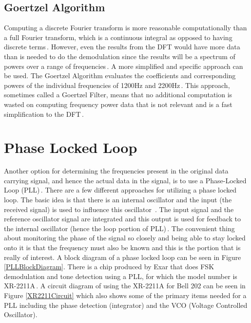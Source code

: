 \subsection{Goertzel Algorithm}
Computing a discrete Fourier transform is more reasonable computationally than a full Fourier transform, which is a continuous integral as opposed to having discrete terms\,\cite{WikipediaFT}. However, even the results from the DFT would have more data than is needed to do the demodulation since the results will be a spectrum of powers over a range of frequencies\,\cite{WikipediaDFT,WikipediaFFT}. A more simplified and specific approach can be used. The Goertzel Algorithm evaluates the coefficients and corresponding powers of the individual frequencies of 1200Hz and 2200Hz\,\cite{WikipediaGA,Elmenreich2011}. This approach, sometimes called a Goertzel Filter, means that no additional computation is wasted on computing frequency power data that is not relevant and is a fast simplification to the DFT\,\cite{SanjitK1993}.

\section{Phase Locked Loop}
Another option for determining the frequencies present in the original data carrying signal, and hence the actual data in the signal, is to use a Phase-Locked Loop (PLL)\,\cite{Akoum,Perrott2009,Lutus2011}. There are a few different approaches for utilizing a phase locked loop. The basic idea is that there is an internal oscillator and the input (the received signal) is used to influence this oscillator\,\cite{Gaeddert2013} . The input signal and the reference oscillator signal are integrated and this output is used for feedback to the internal oscillator (hence the loop portion of PLL)\,\cite{Roppel}. The convenient thing about monitoring the phase of the signal so closely and being able to stay locked onto it is that the frequency must also be known and this is the portion that is really of interest. A block diagram of a phase locked loop can be seen in Figure \ref{PLLBlockDiagram}. There is a chip produced by Exar that does FSK demodulation and tone detection using a PLL, for which the model number is XR-2211A\,\cite{EXAR1997}. A circuit diagram of using the XR-2211A for Bell 202 can be seen in Figure \ref{XR2211Circuit} which also shows some of the primary items needed for a PLL including the phase detection (integrator) and the VCO (Voltage Controlled Oscillator).

